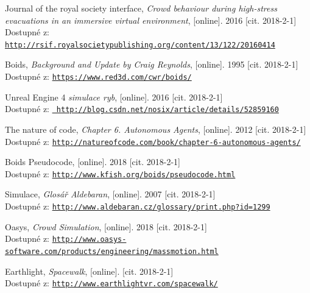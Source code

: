 \documentclass[czech,public,dept460,male,cpdeclaration]{diploma}
\begin{document}
\begin{thebibliography}{99}
	
	 Journal of the royal society interface, 
		\textit{Crowd behaviour during high-stress evacuations in an immersive virtual environment}, [online]. 2016 [cit. 2018-2-1]\\
		Dostupné z: \href{http://rsif.royalsocietypublishing.org/content/13/122/20160414}{\texttt{http://rsif.royalsocietypublishing.org/content/13/122/20160414}}
	
	 Boids, 
		\textit{Background and Update by Craig Reynolds}, [online]. 1995 [cit. 2018-2-1]\\
		Dostupné z: \href{https://www.red3d.com/cwr/boids/}{\texttt{https://www.red3d.com/cwr/boids/}}
	
	 Unreal Engine 4 \textit{simulace ryb}, [online]. 2016 [cit. 2018-2-1]\\
		Dostupné z: \href{		http://blog.csdn.net/nosix/article/details/52859160}{\texttt{		http://blog.csdn.net/nosix/article/details/52859160}}
	
	 The nature of code, 
		\textit{Chapter 6. Autonomous Agents}, [online]. 2012 [cit. 2018-2-1]\\
		Dostupné z: \href{http://natureofcode.com/book/chapter-6-autonomous-agents/}{\texttt{http://natureofcode.com/book/chapter-6-autonomous-agents/}}

	 Boids Pseudocode, 
		[online]. 2018 [cit. 2018-2-1]\\
		Dostupné z: \href{http://www.kfish.org/boids/pseudocode.html}{\texttt{http://www.kfish.org/boids/pseudocode.html}}
		
	 Simulace,
		\textit{Glosář Aldebaran}, [online]. 2007 [cit. 2018-2-1]\\
		Dostupné z: \href{http://www.aldebaran.cz/glossary/print.php?id=1299}{\texttt{http://www.aldebaran.cz/glossary/print.php?id=1299}}
		
	 Oasys,
		\textit{Crowd Simulation}, [online]. 2018 [cit. 2018-2-1]\\
		Dostupné z: \href{http://www.oasys-software.com/products/engineering/massmotion.html}{\texttt{http://www.oasys-software.com/products/engineering/massmotion.html}}
		
	 Earthlight,
		\textit{Spacewalk}, [online]. [cit. 2018-2-1]\\
		Dostupné z: \href{http://www.earthlightvr.com/spacewalk/}{\texttt{http://www.earthlightvr.com/spacewalk/}}
		

\end{thebibliography}
\end{document}
